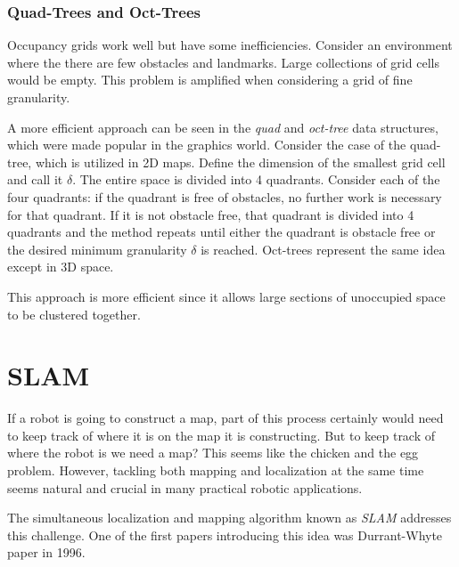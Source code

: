 \subsubsection{Quad-Trees and Oct-Trees}
Occupancy grids work well but have some inefficiencies.  Consider an environment where the
there are few obstacles and landmarks.  Large collections of grid cells would be empty.  This problem
is amplified when considering a grid of fine granularity.  

A more efficient approach can be seen in the \textit{quad} and \textit{oct-tree} data structures, which
were made popular in the graphics world.  Consider the case of the quad-tree, which is utilized 
in 2D maps.  Define the dimension of the smallest grid cell and call it $\delta$. The entire space is divided into 4 quadrants. 
Consider each of the four quadrants: if the quadrant is free of obstacles, no further work is necessary for that quadrant.  If it
is not obstacle free, that quadrant is divided into 4 quadrants and the method repeats until either the quadrant is obstacle free
or the desired minimum granularity $\delta$ is reached.  Oct-trees represent the same idea except in 3D space.

This approach is more efficient since it allows large sections of unoccupied space to be clustered together.




\section{SLAM}
If a robot is going to construct a map, part of this process certainly would need to keep track of
where it is on the map it is constructing. But to keep track of where the robot is we need a map?
This seems like the chicken and the egg problem.  However, tackling both mapping and localization
at the same time seems natural and crucial in many practical robotic applications. 

The simultaneous localization and mapping algorithm known as \textit{SLAM} addresses this challenge.  
One of the first papers introducing this idea was Durrant-Whyte paper in 1996.



